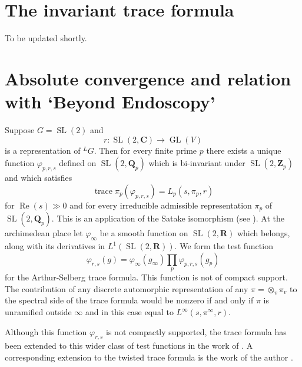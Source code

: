 \documentclass[11pt]{amsart}
\def\C{\mathbf C}
\def\Q{\mathbf Q}
\def\R{\mathbf R}
\def\Z{\mathbf Z}
\def\gl{\operatorname{GL}}
\def\Lone{L^1}
\def\Re{\operatorname{Re}}
\def\sl{\operatorname{SL}}
\def\trace{\operatorname{trace}}
\theoremstyle{remark}
\begin{document}
\section{The invariant trace formula}

{\color{red} To be updated shortly.}




\section{Absolute convergence and relation with `Beyond Endoscopy'}

Suppose $G = \sl(2)$ and 
\[ r : \sl(2, \C) \to \gl(V) \]
is a representation of ${}^LG$. Then for every finite prime $p$ there exists a unique function $\varphi_{p, r, s}$ defined on $\sl(2, \Q_p)$ which is bi-invariant under $\sl(2, \Z_p)$ and which satisfies
\[ \trace \pi_p(\varphi_{p, r, s}) = L_p(s, \pi_p, r) \]
for $\Re(s) \gg 0$ and for every irreducible admissible representation $\pi_p$ of $\sl(2, \Q_p)$. This is an application of the Satake isomorphism (see \cite{MR3220933}). At the archimedean place let $\varphi_\infty$ be a smooth function on $\sl(2, \R)$ which belongs, along with its derivatives in $\Lone(\sl(2, \R))$. We form the test function
\[ \varphi_{r, s}(g) = \varphi_\infty(g_\infty) \displaystyle\prod_p \varphi_{p, r, s}(g_p) \]
for the Arthur-Selberg trace formula. This function is not of compact support. The contribution of any discrete automorphic representation of any $\pi = \otimes_v \pi_v$ to the spectral side of the trace formula would be nonzero if and only if $\pi$ is unramified outside $\infty$ and in this case equal to $L^\infty(s, \pi^\infty, r)$. 

Although this function $\varphi_{r, s}$ is not compactly supported, the trace formula has been extended to this wider class of test functions in the work of \cite{FL16, FLM}. A corresponding extension to the twisted trace formula is the work of the author \cite{Par17}. 




\end{document}
